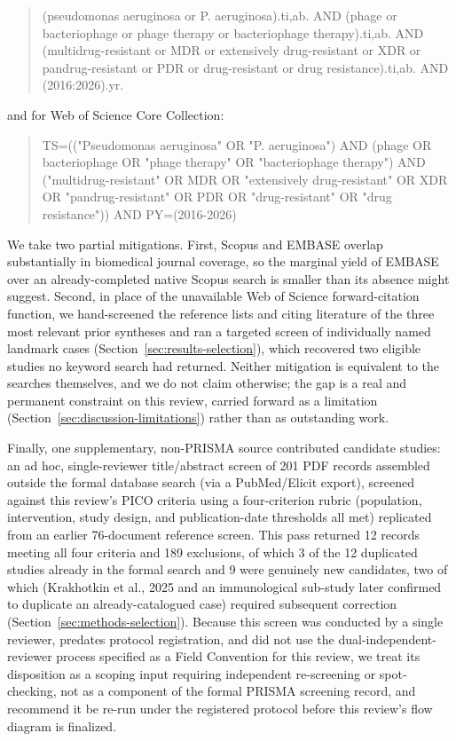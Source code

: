 \begin{quote}
\footnotesize\ttfamily
(pseudomonas aeruginosa or P. aeruginosa).ti,ab. AND (phage or bacteriophage or phage therapy or bacteriophage therapy).ti,ab. AND (multidrug-resistant or MDR or extensively drug-resistant or XDR or pandrug-resistant or PDR or drug-resistant or drug resistance).ti,ab. AND (2016:2026).yr.
\end{quote}

\noindent and for Web of Science Core Collection:

\begin{quote}
\footnotesize\ttfamily
TS=(("Pseudomonas aeruginosa" OR "P. aeruginosa") AND (phage OR bacteriophage OR "phage therapy" OR "bacteriophage therapy") AND ("multidrug-resistant" OR MDR OR "extensively drug-resistant" OR XDR OR "pandrug-resistant" OR PDR OR "drug-resistant" OR "drug resistance")) AND PY=(2016-2026)
\end{quote} We take two partial mitigations. First, Scopus and EMBASE overlap substantially in biomedical journal coverage, so the marginal yield of EMBASE over an already-completed native Scopus search is smaller than its absence might suggest. Second, in place of the unavailable Web of Science forward-citation function, we hand-screened the reference lists and citing literature of the three most relevant prior syntheses \parencite{ElHaddad2019_eskape,Uyttebroek2022_lancetid,Liu2025_ijaa} and ran a targeted screen of individually named landmark cases (Section~\ref{sec:results-selection}), which recovered two eligible studies no keyword search had returned. Neither mitigation is equivalent to the searches themselves, and we do not claim otherwise; the gap is a real and permanent constraint on this review, carried forward as a limitation (Section~\ref{sec:discussion-limitations}) rather than as outstanding work.

Finally, one supplementary, non-PRISMA source contributed candidate studies: an ad hoc, single-reviewer title/abstract screen of 201 PDF records assembled outside the formal database search (via a PubMed/Elicit export), screened against this review's PICO criteria using a four-criterion rubric (population, intervention, study design, and publication-date thresholds all met) replicated from an earlier 76-document reference screen. This pass returned 12 records meeting all four criteria and 189 exclusions, of which 3 of the 12 duplicated studies already in the formal search and 9 were genuinely new candidates, two of which (Krakhotkin et al., 2025 and an immunological sub-study later confirmed to duplicate an already-catalogued case) required subsequent correction (Section~\ref{sec:methods-selection}). Because this screen was conducted by a single reviewer, predates protocol registration, and did not use the dual-independent-reviewer process specified as a Field Convention for this review, we treat its disposition as a scoping input requiring independent re-screening or spot-checking, not as a component of the formal PRISMA screening record, and recommend it be re-run under the registered protocol before this review's flow diagram is finalized.

